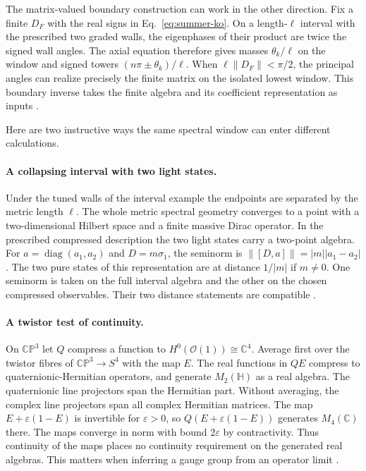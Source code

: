 \documentclass[10pt]{article}
\theoremstyle{definition}
\begin{document}
The matrix-valued boundary construction can work in the other direction. Fix a finite \(D_F\) with the real signs in Eq.~\eqref{eq:summer-ko}. On a length-\(\ell\) interval with the prescribed two graded walls, the eigenphases of their product are twice the signed wall angles. The axial equation therefore gives masses \(\theta_k/\ell\) on the window and signed towers \((n\pi\pm\theta_k)/\ell\). When \(\ell\|D_F\|<\pi/2\), the principal angles can realize precisely the finite matrix on the isolated lowest window. This boundary inverse takes the finite algebra and its coefficient representation as inputs \cite{boundarynote}.

Here are two instructive ways the same spectral window can enter different calculations.

\paragraph{A collapsing interval with two light states.} Under the tuned walls of the interval example the endpoints are separated by the metric length \(\ell\). The whole metric spectral geometry converges to a point with a two-dimensional Hilbert space and a finite massive Dirac operator. In the prescribed compressed description the two light states carry a two-point algebra. For \(a=\operatorname{diag}(a_1,a_2)\) and \(D=m\sigma_1\), the seminorm is \(\|[D,a]\|=|m||a_1-a_2|\). The two pure states of this representation are at distance \(1/|m|\) if \(m\ne0\). One seminorm is taken on the full interval algebra and the other on the chosen compressed observables. Their two distance statements are compatible \cite{towerlesspaper,boundarynote,jointnote}.

\paragraph{A twistor test of continuity.} On \(\mathbb{CP}^3\) let \(Q\) compress a function to \(H^0(\mathcal O(1))\cong\mathbb C^4\). Average first over the twistor fibres of \(\mathbb{CP}^3\to S^4\) with the map \(E\). The real functions in \(QE\) compress to quaternionic-Hermitian operators, and generate \(M_2(\mathbb H)\) as a real algebra. The quaternionic line projectors span the Hermitian part. Without averaging, the complex line projectors span all complex Hermitian matrices. The map \(E+\varepsilon(1-E)\) is invertible for \(\varepsilon>0\), so \(Q(E+\varepsilon(1-E))\) generates \(M_4(\mathbb C)\) there. The maps converge in norm with bound \(2\varepsilon\) by contractivity. Thus continuity of the maps places no continuity requirement on the generated real algebras. This matters when inferring a gauge group from an operator limit \cite{dictionarynote}.
\end{document}
